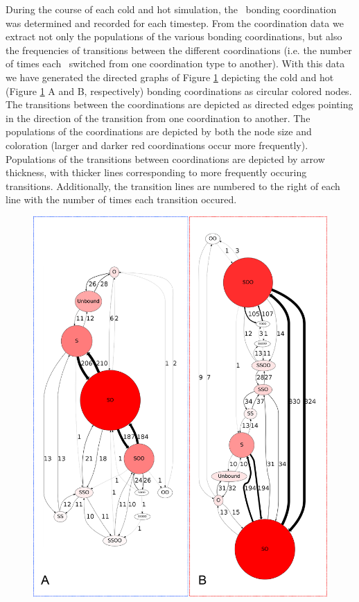 During the course of each cold and hot simulation, the \suldiox~bonding coordination was determined and recorded for each timestep. From the coordination data we extract not only the populations of the various bonding coordinations, but also the frequencies of transitions between the different coordinations (i.e. the number of times each \suldiox~switched from one coordination type to another). With this data we have generated the directed graphs of Figure \ref{fig:coordination-transitions} depicting the cold and hot (Figure \ref{fig:coordination-transitions} A and B, respectively) bonding coordinations as circular colored nodes.\cite{Ellson2004,Gansner1999} The transitions between the coordinations are depicted as directed edges pointing in the direction of the transition from one coordination to another. The populations of the coordinations are depicted by both the node size and coloration (larger and darker red coordinations occur more frequently). Populations of the transitions between coordinations are depicted by arrow thickness, with thicker lines corresponding to more frequently occuring transitions. Additionally, the transition lines are numbered to the right of each line with the number of times each transition occured. 

\begin{figure}[h!]
	\begin{center}
		\includegraphics[scale=1.0]{images/coordinations/coordination-transitions.png}
		\caption{}
		\label{fig:coordination-transitions}
	\end{center}
\end{figure}

